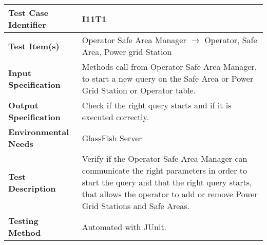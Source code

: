 \begin{tabular}{l p{}}
    \hline
    \textbf{Test Case Identifier} & I11T1\\
    \hline
    \textbf{Test Item(s)} & Operator Safe Area Manager $\rightarrow$ Operator, Safe Area, Power grid Station\\
    \hline
    \textbf{Input Specification} & Methods call from Operator Safe Area Manager, to start a new query on the Safe Area or Power Grid Station or Operator table.\\
    \hline
    \textbf{Output Specification} & Check if the right query starts and if it is executed correctly.\\
    \hline
    \textbf{Environmental Needs} &  GlassFish Server\\
    \hline
    \textbf{Test Description} & Verify if the Operator Safe Area Manager can communicate the right parameters in order to start the query and that the right query starts, that allows the operator to add or remove Power Grid Stations and Safe Areas.\\
    \hline
    \textbf{Testing Method} & Automated with JUnit.\\
    \hline
\end{tabular}